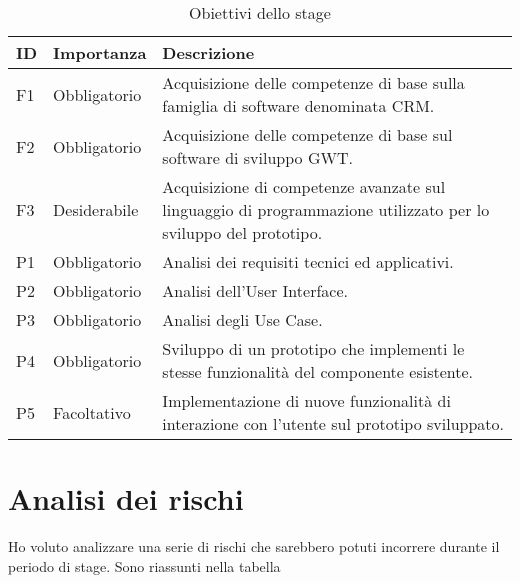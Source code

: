 \begin{table}[h]
	\centering
	\caption{Obiettivi dello stage}
	\label{tab:obiettivi}
	\begin{tabular}{|l|p{4cm}|p{8cm}|}
		\hline
		\rule[-4mm]{0mm}{1cm}
		ID & Importanza & Descrizione \\
		\hline
		\rule[-3mm]{0mm}{0.8cm}
		F1 & Obbligatorio & Acquisizione delle competenze di base sulla famiglia di software denominata CRM.\\
		\hline
		\rule[-3mm]{0mm}{0.8cm}
		F2 & Obbligatorio & Acquisizione delle competenze di base sul software di sviluppo GWT.\\
		\hline
		\rule[-3mm]{0mm}{0.8cm}
		F3 & Desiderabile & Acquisizione di competenze avanzate sul linguaggio di programmazione utilizzato per lo sviluppo del prototipo.\\
		\hline
		\rule[-3mm]{0mm}{0.8cm}
		P1 & Obbligatorio & Analisi dei requisiti tecnici ed applicativi.\\
		\hline
		\rule[-3mm]{0mm}{0.8cm}
		P2 & Obbligatorio & Analisi dell'User Interface.\\
		\hline
		\rule[-3mm]{0mm}{0.8cm}
		P3 & Obbligatorio & Analisi degli Use Case.\\
		\hline
		\rule[-3mm]{0mm}{0.8cm}
		P4 & Obbligatorio & Sviluppo di un prototipo che implementi le stesse funzionalità del componente esistente.\\
		\hline
		\rule[-3mm]{0mm}{0.8cm}
		P5 & Facoltativo & Implementazione di nuove funzionalità di interazione con l'utente sul prototipo sviluppato.\\
		\hline
	\end{tabular}
\end{table}

\section {Analisi dei rischi}
Ho voluto analizzare una serie di rischi che sarebbero potuti incorrere durante il periodo di stage. Sono riassunti nella tabella\\ %

